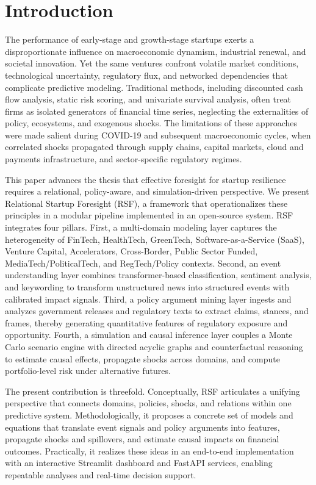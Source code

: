\documentclass[conference]{IEEEtran}
\begin{document}
\section{Introduction}
The performance of early-stage and growth-stage startups exerts a disproportionate influence on macroeconomic dynamism, industrial renewal, and societal innovation. Yet the same ventures confront volatile market conditions, technological uncertainty, regulatory flux, and networked dependencies that complicate predictive modeling. Traditional methods, including discounted cash flow analysis, static risk scoring, and univariate survival analysis, often treat firms as isolated generators of financial time series, neglecting the externalities of policy, ecosystems, and exogenous shocks. The limitations of these approaches were made salient during COVID-19 and subsequent macroeconomic cycles, when correlated shocks propagated through supply chains, capital markets, cloud and payments infrastructure, and sector-specific regulatory regimes.

This paper advances the thesis that effective foresight for startup resilience requires a relational, policy-aware, and simulation-driven perspective. We present Relational Startup Foresight (RSF), a framework that operationalizes these principles in a modular pipeline implemented in an open-source system. RSF integrates four pillars. First, a multi-domain modeling layer captures the heterogeneity of FinTech, HealthTech, GreenTech, Software-as-a-Service (SaaS), Venture Capital, Accelerators, Cross-Border, Public Sector Funded, MediaTech/PoliticalTech, and RegTech/Policy contexts. Second, an event understanding layer combines transformer-based classification, sentiment analysis, and keywording to transform unstructured news into structured events with calibrated impact signals. Third, a policy argument mining layer ingests and analyzes government releases and regulatory texts to extract claims, stances, and frames, thereby generating quantitative features of regulatory exposure and opportunity. Fourth, a simulation and causal inference layer couples a Monte Carlo scenario engine with directed acyclic graphs and counterfactual reasoning to estimate causal effects, propagate shocks across domains, and compute portfolio-level risk under alternative futures.

The present contribution is threefold. Conceptually, RSF articulates a unifying perspective that connects domains, policies, shocks, and relations within one predictive system. Methodologically, it proposes a concrete set of models and equations that translate event signals and policy arguments into features, propagate shocks and spillovers, and estimate causal impacts on financial outcomes. Practically, it realizes these ideas in an end-to-end implementation with an interactive Streamlit dashboard and FastAPI services, enabling repeatable analyses and real-time decision support.
\end{document}
